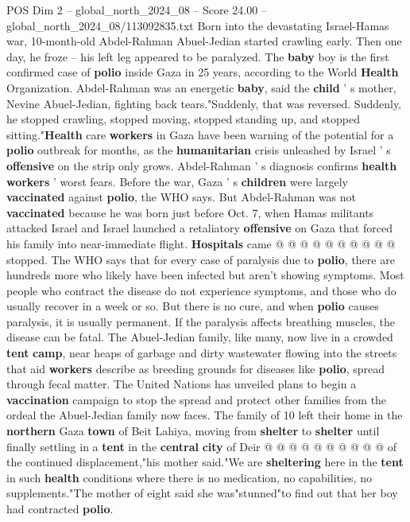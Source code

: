 \begin{textsample}{POS Dim 2 – global\_north\_2024\_08 – Score 24.00 – global\_north\_2024\_08/113092835.txt}  \label{ex:f2_pos_399}
Born into the devastating Israel-Hamas war, 10-month-old Abdel-Rahman Abuel-Jedian started crawling early.
Then one day, he froze -- his left leg appeared to be paralyzed.
The \textbf{baby} boy is the first confirmed case of \textbf{polio} inside Gaza in 25 years, according to the World \textbf{Health} Organization.
Abdel-Rahman was an energetic \textbf{baby}, said the \textbf{child} ' s mother, Nevine Abuel-Jedian, fighting back tears."Suddenly, that was reversed.
Suddenly, he stopped crawling, stopped moving, stopped standing up, and stopped sitting."\textbf{Health} care \textbf{workers} in Gaza have been warning of the potential for a \textbf{polio} outbreak for months, as the \textbf{humanitarian} crisis unleashed by Israel ' s \textbf{offensive} on the strip only grows.
Abdel-Rahman ' s diagnosis confirms \textbf{health} \textbf{workers} ' worst fears.
Before the war, Gaza ' s \textbf{children} were largely \textbf{vaccinated} against \textbf{polio}, the WHO says.
But Abdel-Rahman was not \textbf{vaccinated} because he was born just before Oct. 7, when Hamas militants attacked Israel and Israel launched a retaliatory \textbf{offensive} on Gaza that forced his family into near-immediate flight. \textbf{Hospitals} came @ @ @ @ @ @ @ @ @ @ stopped.
The WHO says that for every case of paralysis due to \textbf{polio}, there are hundreds more who likely have been infected but aren't showing symptoms.
Most people who contract the disease do not experience symptoms, and those who do usually recover in a week or so.
But there is no cure, and when \textbf{polio} causes paralysis, it is usually permanent.
If the paralysis affects breathing muscles, the disease can be fatal.
The Abuel-Jedian family, like many, now live in a crowded \textbf{tent} \textbf{camp}, near heaps of garbage and dirty wastewater flowing into the streets that aid \textbf{workers} describe as breeding grounds for diseases like \textbf{polio}, spread through fecal matter.
The United Nations has unveiled plans to begin a \textbf{vaccination} campaign to stop the spread and protect other families from the ordeal the Abuel-Jedian family now faces.
The family of 10 left their home in the \textbf{northern} Gaza \textbf{town} of Beit Lahiya, moving from \textbf{shelter} to \textbf{shelter} until finally settling in a \textbf{tent} in the \textbf{central} \textbf{city} of Deir @ @ @ @ @ @ @ @ @ @ of the continued displacement,"his mother said."We are \textbf{sheltering} here in the \textbf{tent} in such \textbf{health} conditions where there is no medication, no capabilities, no supplements."The mother of eight said she was"stunned"to find out that her boy had contracted \textbf{polio}.

\end{textsample}
